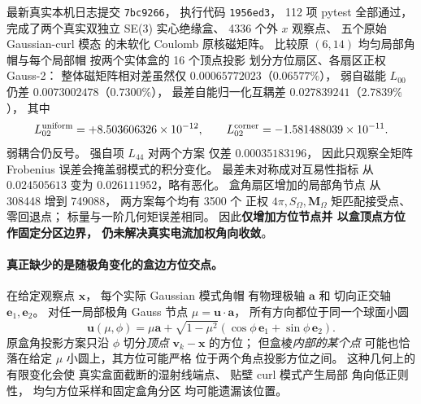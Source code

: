 最新真实本机日志提交 \texttt{7bc9266}，
执行代码 \texttt{1956ed3}，
112 项 pytest 全部通过，
完成了两个真实双独立 SE(3) 实心绝缘盒、
4336 个外 $x$ 观察点、
五个原始 Gaussian-curl 模态
的未软化 Coulomb 原核磁矩阵。
比较原 $(6,14)$
均匀局部角帽与每个局部帽
按两个实体盒的 16 个顶点投影
划分方位扇区、各扇区正权 Gauss-2：
整体磁矩阵相对差虽然仅
$0.00065772023$（$0.06577\%$），
弱自磁能 $L_{00}$ 仍差
$0.0073002478$（$0.7300\%$），
最差自能归一化互耦差
$0.027839241$（$2.7839\%$），
其中
\[
 L_{02}^{\rm uniform}
 =+8.503606326\times10^{-12},
 \qquad
 L_{02}^{\rm corner}
 =-1.581488039\times10^{-11}.
\]
弱耦合仍反号。
强自项 $L_{44}$ 对两个方案
仅差 $0.00035183196$，
因此只观察全矩阵 Frobenius
误差会掩盖弱模式的积分变化。
最差未对称成对互易性指标
从 $0.024505613$ 变为
$0.026111952$，略有恶化。
盒角扇区增加的局部角节点
从 308448 增到 749088，
两方案每个均有 3500 个
正权 $4\pi,S_\Omega,\bm M_\Omega$
矩匹配接受点、零回退点；
标量与一阶几何矩误差相同。
因此\textbf{仅增加方位节点并
以盒顶点方位作固定分区边界，
仍未解决真实电流加权角向收敛}。

\paragraph{真正缺少的是随极角变化的盒边方位交点。}
在给定观察点 $\bm x$，
每个实际 Gaussian 模式角帽
有物理极轴 $\bm a$ 和
切向正交轴 $\bm e_1,\bm e_2$。
对任一局部极角 Gauss 节点
$\mu=\bm u\cdot\bm a$，
所有方向都位于同一个球面小圆
\[
 \bm u(\mu,\phi)
 =\mu\bm a+
 \sqrt{1-\mu^2}
  (\cos\phi\,\bm e_1+
   \sin\phi\,\bm e_2).
\]
原盒角投影方案只沿 $\phi$
切分\emph{顶点}
$\bm v_k-\bm x$ 的方位；
但盒棱\emph{内部的某个点}
可能也恰落在给定 $\mu$
小圆上，其方位可能严格
位于两个角点投影方位之间。
这种几何上的有限变化会使
真实盒面截断的湿射线端点、
贴壁 curl 模式产生局部
角向低正则性，
均匀方位采样和固定盒角分区
均可能遗漏该位置。

